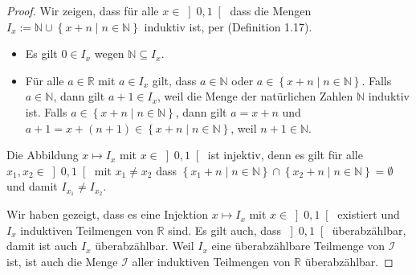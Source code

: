 \documentclass[12pt]{extarticle}
\begin{document}
\begin{proof}
  Wir zeigen, dass für alle \(x \in \left] 0, 1 \right[\)
  dass die Mengen
  $I_x:= \mathbb{N} \cup \left\{ x+n  \mid  n \in \mathbb{N}
  \right\}$ induktiv ist, per (Definition 1.17).

  \begin{itemize}
  \item Es gilt \(0 \in I_x\) wegen $\mathbb{N} \subseteq
    I_x$.
  \item Für alle \(a \in \mathbb{R}\) mit \(a \in I_x\)
    gilt, dass \(a \in \mathbb{N}\) oder
    \(a \in \left\{ x + n  \mid  n \in \mathbb{N}\right\}\).
    Falls \(a \in \mathbb{N}\), dann gilt \(a+1 \in I_x\),
    weil die Menge der natürlichen Zahlen \(\mathbb{N}\)
    induktiv ist. Falls
    \(a \in \left\{ x + n  \mid  n \in \mathbb{N}\right\}\),
    dann gilt \(a = x + n\) und
    $a + 1 = x + (n + 1) \in \left\{ x + n  \mid  n \in
      \mathbb{N}\right\}$, weil \(n+1 \in \mathbb{N}\).
  \end{itemize}

  Die Abbildung \(x \mapsto I_x\) mit
  \(x \in \left]0, 1 \right[\) ist injektiv, denn es gilt
  für alle \(x_1, x_2 \in \left]0, 1\right[\) mit
  \(x_1 \neq x_2\) dass
  $\left\{ x_1+n \mid n \in \mathbb{N} \right\} \cap
  \left\{ x_2+n \mid n \in \mathbb{N} \right\} =
  \emptyset$ und damit \(I_{x_1} \neq I_{x_2}\).

  Wir haben gezeigt, dass es eine Injektion
  \(x \mapsto I_x\) mit \(x \in \left] 0, 1 \right[\)
  existiert und \(I_x\) induktiven Teilmengen von
  \(\mathbb{R}\) sind.  Es gilt auch, dass
  \(\left] 0, 1 \right[\) überabzählbar, damit ist auch
  \(I_x\) überabzählbar. Weil \(I_x\) eine überabzählbare
  Teilmenge von \(\mathcal{I}\) ist, ist auch die Menge
  \(\mathcal{I}\) aller induktiven Teilmengen von
  \(\mathbb{R}\) überabzählbar.

\end{proof}
\end{document}
